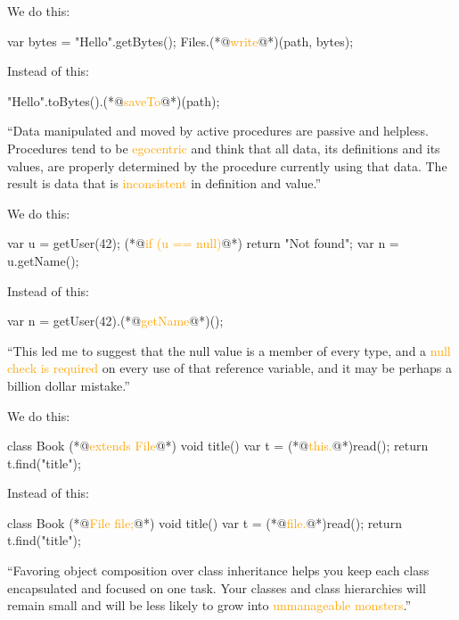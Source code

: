 \documentclass{article}
\newcommand\hlt[1]{\textcolor{orange}{#1}}
\begin{document}
  \begin{multicols}{2}
  We do this:
{\small\begin{ffcode}
var bytes = "Hello".getBytes();
Files.(*@\textcolor{orange}{write}@*)(path, bytes);
\end{ffcode}
  }\par
  Instead of this:
{\small\begin{ffcode}
"Hello".toBytes().(*@\textcolor{orange}{saveTo}@*)(path);
\end{ffcode}
  }
  \par\columnbreak\par
  ``Data manipulated and moved by active procedures are passive and helpless. Procedures tend to be \hlt{egocentric} and think that all data, its definitions and its values, are properly determined by the procedure currently using that data. The result is data that is \hlt{inconsistent} in definition and value.''
  \end{multicols}
  \plush{}

  \begin{multicols}{2}
  We do this:
{\small\begin{ffcode}
var u = getUser(42);
(*@\textcolor{orange}{if (u == null)}@*)
  return "Not found";
var n = u.getName();
\end{ffcode}
  }\par
  Instead of this:
{\small\begin{ffcode}
var n = getUser(42).(*@\textcolor{orange}{getName}@*)();
\end{ffcode}
  }
  \par\columnbreak\par
  ``This led me to suggest that the null value is a member of every type, and a \hlt{null check is required} on every use of that reference variable, and it may be perhaps a billion dollar mistake.''
  \end{multicols}
  \plush{}

  \begin{multicols}{2}
  We do this:
{\small\begin{ffcode}
class Book (*@\textcolor{orange}{extends File}@*)
  void title()
    var t = (*@\textcolor{orange}{this.}@*)read();
    return t.find("title");
\end{ffcode}
  }\par
  Instead of this:
{\small\begin{ffcode}
class Book
  (*@\textcolor{orange}{File file;}@*)
  void title()
    var t = (*@\textcolor{orange}{file.}@*)read();
    return t.find("title");
\end{ffcode}
  }
  \par\columnbreak\par
  ``Favoring object composition over class inheritance helps you keep each class encapsulated and focused on one task. Your classes and class hierarchies will remain small and will be less likely to grow into \hlt{unmanageable monsters}.''
  \end{multicols}
  \plush{}
\end{document}
